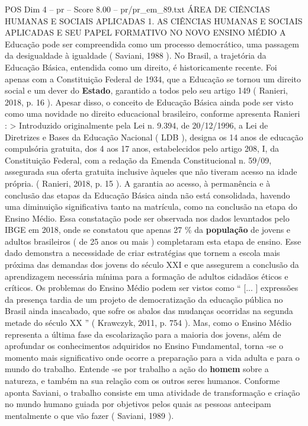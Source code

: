 \begin{textsample}{POS Dim 4 – pr – Score 8.00 – pr/pr\_em\_89.txt}  \label{ex:f4_pos_190}
ÁREA DE CIÊNCIAS HUMANAS E SOCIAIS APLICADAS 1.
AS CIÊNCIAS HUMANAS E SOCIAIS APLICADAS E SEU PAPEL FORMATIVO NO NOVO ENSINO MÉDIO A Educação pode ser compreendida como um processo democrático, uma passagem da desigualdade à igualdade ( Saviani, 1988 ).
No Brasil, a trajetória da Educação Básica, entendida como um direito, é historicamente recente.
Foi apenas com a Constituição Federal de 1934, que a Educação se tornou um direito social e um dever do \textbf{Estado}, garantido a todos pelo seu artigo 149 ( Ranieri, 2018, p. 16 ).
Apesar disso, o conceito de Educação Básica ainda pode ser visto como uma novidade no direito educacional brasileiro, conforme apresenta Ranieri : > Introduzido originalmente pela Lei n. 9.394, de 20/12/1996, a Lei de Diretrizes e Bases da Educação Nacional ( LDB ), designa os 14 anos de educação compulsória gratuita, dos 4 aos 17 anos, estabelecidos pelo artigo 208, I, da Constituição Federal, com a redação da Emenda Constitucional n. 59/09, assegurada sua oferta gratuita inclusive àqueles que não tiveram acesso na idade própria. ( Ranieri, 2018, p. 15 ).
A garantia ao acesso, à permanência e à conclusão das etapas da Educação Básica ainda não está consolidada, havendo uma diminuição significativa tanto na matrícula, como na conclusão na etapa do Ensino Médio.
Essa constatação pode ser observada nos dados levantados pelo IBGE em 2018, onde se constatou que apenas 27 \% da \textbf{população} de jovens e adultos brasileiros ( de 25 anos ou mais ) completaram esta etapa de ensino.
Esse dado demonstra a necessidade de criar estratégias que tornem a escola mais próxima das demandas dos jovens do século XXI e que assegurem a conclusão da aprendizagem necessária mínima para a formação de adultos cidadãos éticos e críticos.
Os problemas do Ensino Médio podem ser vistos como “ [... ] expressões da presença tardia de um projeto de democratização da educação pública no Brasil ainda inacabado, que sofre os abalos das mudanças ocorridas na segunda metade do século XX ” ( Krawczyk, 2011, p. 754 ).
Mas, como o Ensino Médio representa a última fase da escolarização para a maioria dos jovens, além de aprofundar os conhecimentos adquiridos no Ensino Fundamental, torna -se o momento mais significativo onde ocorre a preparação para a vida adulta e para o mundo do trabalho.
Entende -se por trabalho a ação do \textbf{homem} sobre a natureza, e também na sua relação com os outros seres humanos.
Conforme aponta Saviani, o trabalho consiste em uma atividade de transformação e criação no mundo humano guiada por objetivos pelos quais as pessoas antecipam mentalmente o que vão fazer ( Saviani, 1989 ).

\end{textsample}
